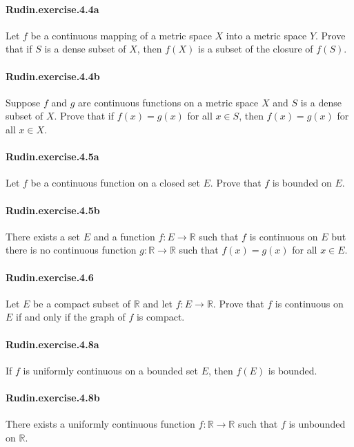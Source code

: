 \documentclass{article}
\begin{document}
\paragraph{Rudin.exercise.4.4a} Let $f$ be a continuous mapping of a metric space $X$ into a metric space $Y$. Prove that if $S$ is a dense subset of $X$, then $f(X)$ is a subset of the closure of $f(S)$.

\paragraph{Rudin.exercise.4.4b} Suppose $f$ and $g$ are continuous functions on a metric space $X$ and $S$ is a dense subset of $X$. Prove that if $f(x)=g(x)$ for all $x \in S$, then $f(x)=g(x)$ for all $x \in X$.

\paragraph{Rudin.exercise.4.5a} Let $f$ be a continuous function on a closed set $E$. Prove that $f$ is bounded on $E$.

\paragraph{Rudin.exercise.4.5b} There exists a set $E$ and a function $f:E\to\mathbb{R}$ such that $f$ is continuous on $E$ but there is no continuous function $g:\mathbb{R}\to\mathbb{R}$ such that $f(x)=g(x)$ for all $x\in E$.

\paragraph{Rudin.exercise.4.6} Let $E$ be a compact subset of $\mathbb{R}$ and let $f:E\to\mathbb{R}$. Prove that $f$ is continuous on $E$ if and only if the graph of $f$ is compact.

\paragraph{Rudin.exercise.4.8a} If $f$ is uniformly continuous on a bounded set $E$, then $f(E)$ is bounded.

\paragraph{Rudin.exercise.4.8b} There exists a uniformly continuous function $f:\mathbb{R}\to\mathbb{R}$ such that $f$ is unbounded on $\mathbb{R}$.
\end{document}
